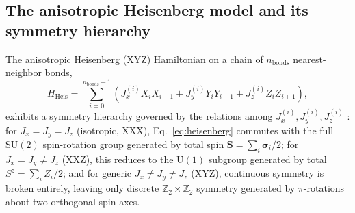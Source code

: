\documentclass[11pt]{article}
\begin{document}
\subsection{The anisotropic Heisenberg model and its symmetry hierarchy}
The anisotropic Heisenberg (XYZ) Hamiltonian on a chain of $n_{\text{bonds}}$ nearest-neighbor bonds,
\begin{equation}
H_{\text{Heis}} = \sum_{i=0}^{n_{\text{bonds}}-1} \left(J_x^{(i)} X_i X_{i+1} + J_y^{(i)} Y_i Y_{i+1} + J_z^{(i)} Z_i Z_{i+1}\right),
\label{eq:heisenberg}
\end{equation}
exhibits a symmetry hierarchy governed by the relations among $J_x^{(i)},J_y^{(i)},J_z^{(i)}$ \cite{Craps2024,Franchini2017}: for $J_x=J_y=J_z$ (isotropic, XXX), Eq.~\eqref{eq:heisenberg} commutes with the full $\mathrm{SU}(2)$ spin-rotation group generated by total spin $\bm{S}=\sum_i \bm{\sigma}_i/2$; for $J_x=J_y\neq J_z$ (XXZ), this reduces to the $\mathrm{U}(1)$ subgroup generated by total $S^z=\sum_i Z_i/2$; and for generic $J_x\neq J_y\neq J_z$ (XYZ), continuous symmetry is broken entirely, leaving only discrete $\mathbb{Z}_2\times\mathbb{Z}_2$ symmetry generated by $\pi$-rotations about two orthogonal spin axes.
\end{document}
